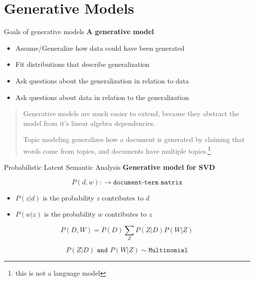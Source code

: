 \documentclass[10pt]{beamer}
\begin{document}
\section{Generative Models}
\begin{frame}{Goals of generative models}
  {\bf A generative model}

  \begin{itemize}
  \item Assume/Generalize how data could have been generated
  \item Fit distributions that describe generalization
  \item Ask questions about the generalization in relation to data
  \item Ask questions about data in relation to the generalization
  \end{itemize}

  \vspace{1em}

  \begin{quote}
    Generative models are much easier to extend, because they abstract the model from it's linear algebra dependencies.

    \vspace{1em}

  Topic modeling generalizes how a document is generated by claiming that words come from topics, and documents have multiple topics.\footnote{this is not a language model} %

  \end{quote}

\end{frame}


\begin{frame}{Probabilistic Latent Semantic Analysis}
  {\bf Generative model for SVD}

  \[P(d,w):\rightarrow \texttt{document-term matrix}\]

    \begin{itemize}
    \item  $P(z|d)$ is the probability $z$ contributes to $d$
    \item  $P(w|z)$ is the probability $w$ contributes to $z$
    \end{itemize}

    \[P(D,W) = P(D)\sum_Z P(Z|D)P(W|Z)\]

    \[P(Z|D) \texttt{ and } P(W|Z) \sim \texttt{Multinomial}\]

\end{frame}
\end{document}
